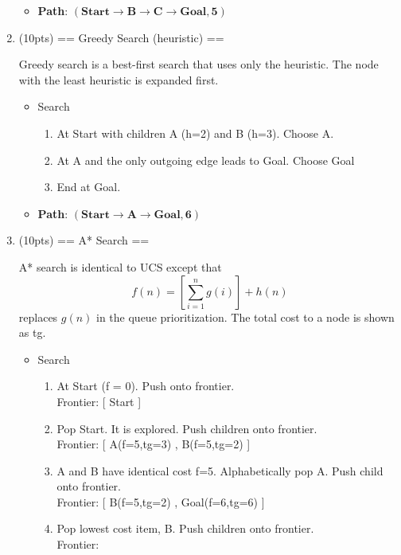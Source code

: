 \documentclass[fleqn]{hermans-hw}
\begin{document}
\begin{enumerate}
\begin{itemize}
\begin{enumerate}
	\end{enumerate}
	\item \textbf{Path}: $\mathbf{(Start \rightarrow B \rightarrow C \rightarrow Goal, 5)}$
\end{itemize}

\item (10pts) == Greedy Search (heuristic) ==

Greedy search is a best-first search that uses only the heuristic.  The node with the least heuristic is expanded first.

\begin{itemize}
	\item Search
	\begin{enumerate}
		\item At Start with children A (h=2) and B (h=3). Choose A.
		\item At A and the only outgoing edge leads to Goal. Choose Goal
		\item End at Goal.
	\end{enumerate}
	\item \textbf{Path}: $\mathbf{(Start \rightarrow A \rightarrow Goal, 6)}$
\end{itemize}


\item (10pts) == A* Search ==

A* search is identical to UCS except that $$ f(n) = \left[\sum_{i=1}^{n}g(i)\right] + h(n)  $$ replaces $ g(n) $ in the queue prioritization. The total cost to a node is shown as tg.

\begin{itemize}
	\item Search
	\begin{enumerate}
		\item At Start (f = 0). Push onto frontier. \\
		Frontier: [ Start ]
		
		\item Pop Start.  It is explored.  Push children onto frontier.\\ 
		Frontier: [ A(f=5,tg=3) , B(f=5,tg=2) ]
		
		\item A and B have identical cost f=5. Alphabetically pop A. Push child onto frontier.\\
		Frontier: [ B(f=5,tg=2) , Goal(f=6,tg=6) ]
		
		\item Pop lowest cost item, B. Push children onto frontier.\\ Frontier: \newline
		[Goal(f=6,tg=6) , C(f=5,tg=4) , D(f=4,tg=3) , Goal(f=6,tg=6)]
		

\end{enumerate}
\end{itemize}
\end{enumerate}
\end{document}
